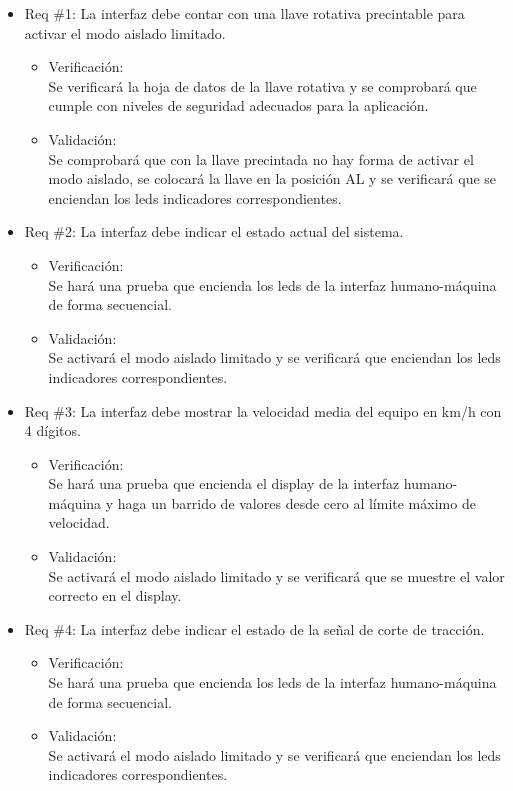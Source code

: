 \documentclass[11pt]{charter}
\begin{document}
\begin{itemize}
\item Req \#1: La interfaz debe contar con una llave rotativa precintable para activar el modo aislado limitado.
\begin{itemize}
  \item Verificación:\\
  Se verificará la hoja de datos de la llave rotativa y se comprobará que cumple con niveles de seguridad adecuados para la aplicación.
  \item Validación:\\
  Se comprobará que con la llave precintada no hay forma de activar el modo aislado, se colocará la llave en la posición AL y se verificará que se enciendan los leds indicadores correspondientes.
\end{itemize}

\item Req \#2: La interfaz debe indicar el estado actual del sistema.
\begin{itemize}
  \item Verificación:\\
  Se hará una prueba que encienda los leds de la interfaz humano-máquina de forma secuencial.
  \item Validación:\\
  Se activará el modo aislado limitado y se verificará que enciendan los leds indicadores correspondientes.
\end{itemize}

\item Req \#3: La interfaz debe mostrar la velocidad media del equipo en km/h con 4 dígitos.
\begin{itemize}
  \item Verificación:\\
  Se hará una prueba que encienda el display de la interfaz humano-máquina y haga un barrido de valores desde cero al límite máximo de velocidad.
  \item Validación:\\
  Se activará el modo aislado limitado y se verificará que se muestre el valor correcto en el display.
\end{itemize}

\item Req \#4: La interfaz debe indicar el estado de la señal de corte de tracción.
\begin{itemize}
  \item Verificación:\\
  Se hará una prueba que encienda los leds de la interfaz humano-máquina de forma secuencial.
  \item Validación:\\
  Se activará el modo aislado limitado y se verificará que enciendan los leds indicadores correspondientes.
\end{itemize}


\end{itemize}
\end{document}
